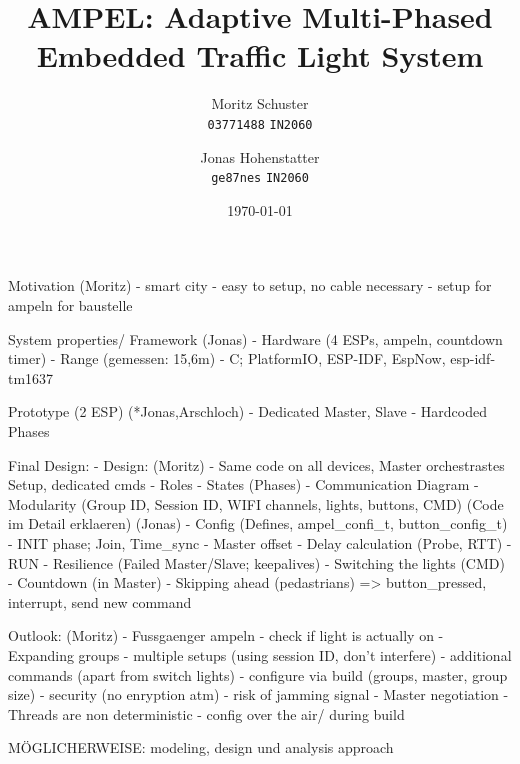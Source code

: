 \documentclass[12pt, a4paper]{article}
\title{\textbf{AMPEL: Adaptive Multi-Phased Embedded Traffic Light System}}
\author{
    Moritz Schuster \\
    \texttt{03771488}
    \texttt{IN2060}
    \and
    Jonas Hohenstatter \\
    \texttt{ge87nes}
    \texttt{IN2060}
}
\date{\today}
\begin{document}
\maketitle
Motivation (Moritz)
- smart city
- easy to setup, no cable necessary
- setup for ampeln for baustelle

System properties/ Framework (Jonas)
- Hardware (4 ESPs, ampeln, countdown timer)
- Range (gemessen: 15,6m)
- C; PlatformIO, ESP-IDF, EspNow, esp-idf-tm1637

Prototype (2 ESP) (*Jonas,Arschloch)
- Dedicated Master, Slave
- Hardcoded Phases

Final Design:
- Design: (Moritz)
    - Same code on all devices, Master orchestrastes Setup, dedicated cmds
    - Roles
    - States (Phases)
    - Communication Diagram
    - Modularity (Group ID, Session ID, WIFI channels, lights, buttons, CMD)
(Code im Detail erklaeren) (Jonas)
- Config (Defines, ampel\_confi\_t, button\_config\_t)
- INIT phase; Join, Time_sync
    - Master offset
    - Delay calculation (Probe, RTT)
- RUN
    - Resilience (Failed Master/Slave; keepalives)
    - Switching the lights (CMD)
    - Countdown (in Master)
    - Skipping ahead (pedastrians) => button_pressed, interrupt, send new command

Outlook: (Moritz)
- Fussgaenger ampeln
- check if light is actually on
- Expanding groups
- multiple setups (using session ID, don't interfere)
- additional commands (apart from switch lights)
- configure via build (groups, master, group size)
- security (no enryption atm)
- risk of jamming signal
- Master negotiation
- Threads are non deterministic
- config over the air/ during build

MÖGLICHERWEISE: modeling, design und analysis approach








 
\end{document}
